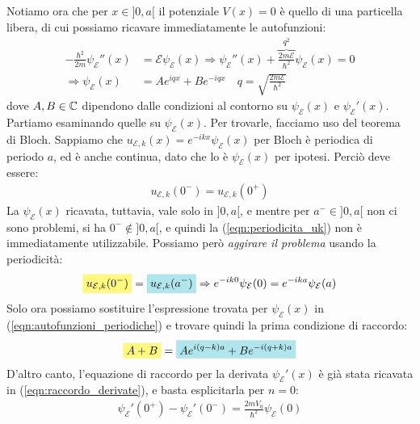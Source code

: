 \documentclass[../../FisicaTeorica.tex]{subfiles}
\begin{document}
\begin{enumerate}
Notiamo ora che per $x \in ]0,a[$ il potenziale $V(x) = 0$\marginpar{Autofunzioni $\psi_\mathcal{E}(x)$, $x \in ]0,a[$} è quello di una particella libera, di cui possiamo ricavare immediatamente le autofunzioni:
\begin{align}\nonumber
-\frac{\hbar^2}{2m}\psi_\mathcal{E}''(x) &=\mathcal{E}\psi_\mathcal{E}(x) \Rightarrow \psi_\mathcal{E}''(x) + \overbrace{\frac{2m\mathcal{E}}{\hbar^2}}^{q^2}\psi_\mathcal{E}(x) = 0\\
\Rightarrow \psi_\mathcal{E}(x) &= A e^{iqx} + Be^{-iqx} \quad q=\sqrt{\frac{2m\mathcal{E}}{\hbar^2}} \label{eqn:autofunzioni_periodiche}
\end{align}
dove $A, B \in \mathbb{C}$ dipendono dalle condizioni al contorno su $\psi_\mathcal{E}(x)$ e $\psi_\mathcal{E}'(x)$.\\
Partiamo esaminando quelle su $\psi_\mathcal{E}(x)$. Per trovarle, facciamo uso del teorema di Bloch. 
Sappiamo che $u_{\mathcal{E},k}(x) = e^{-ikx} \psi_\mathcal{E}(x)$ per Bloch è periodica di periodo $a$, ed è anche continua, dato che lo è $\psi_\mathcal{E}(x)$ per ipotesi. Perciò deve essere:
\begin{align}
u_{\mathcal{E},k}(0^-) = u_{\mathcal{E},k}(0^+)
\label{eqn:periodicita_uk}
\end{align}
La $\psi_\mathcal{E}(x)$ ricavata, tuttavia, vale solo in $]0,a[$, e mentre per $a^- \in ]0,a[$ non ci sono problemi, si ha $0^- \notin ]0,a[$, e quindi la (\ref{eqn:periodicita_uk}) non è immediatamente utilizzabile. Possiamo però \textit{aggirare il problema} usando la periodicità:
\begin{align}
\hlc{Yellow}{u_{\mathcal{E},k}(0^-)} = \hlc{SkyBlue}{u_{\mathcal{E},k}(a^-)} \Rightarrow e^{-ik0}\psi_\mathcal{E}(0) = e^{-ika}\psi_\mathcal{E}(a)
\label{eqn:periodic2}
\end{align}
Solo ora possiamo sostituire l'espressione trovata per $\psi_\mathcal{E}(x)$ in (\ref{eqn:autofunzioni_periodiche}) e trovare quindi la prima condizione di raccordo:
\begin{align}
\hlc{Yellow}{A + B }= \hlc{SkyBlue}{Ae^{i(q-k)a} + Be^{-i(q+k)a}}
\label{eqn:raccordo_func}
\end{align}
D'altro canto, l'equazione di raccordo per la derivata $\psi_\mathcal{E}'(x)$ è già stata ricavata in (\ref{eqn:raccordo_derivate}), e basta esplicitarla per $n=0$:
\begin{align*}
{\psi_\mathcal{E}'(0^+)} - \psi_\mathcal{E}'(0^-) = \frac{2mV_0}{\hbar^2}\psi_\mathcal{E}(0)

\end{align*}
\end{enumerate}
\end{document}

